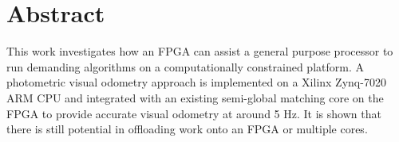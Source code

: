 \chapter*{Abstract}

This work investigates how an FPGA can assist a general purpose processor to
run demanding algorithms on a computationally constrained platform. A
photometric visual odometry approach is implemented on a Xilinx Zynq-7020 ARM
CPU and integrated with an existing semi-global matching core on the FPGA
to provide accurate visual odometry at around 5 Hz. It is shown that there is
still potential in offloading work onto an FPGA or multiple cores.
